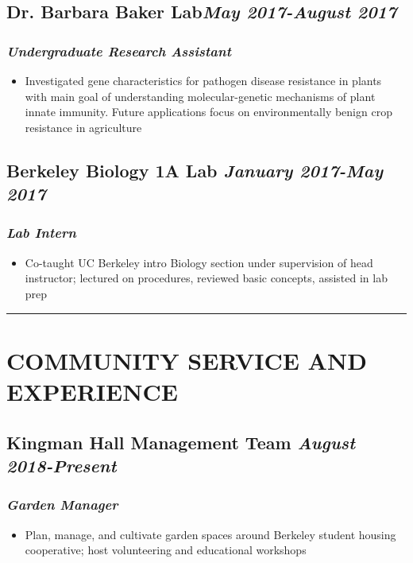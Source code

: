 \documentclass{article}
\begin{document}
\subsection*{\bf{Dr. Barbara Baker Lab}\hfill\textit{\small May 2017-August 2017}}
\subsubsection*{\textit{Undergraduate Research Assistant}}
\begin{itemize}
    \item {Investigated gene characteristics for pathogen disease resistance in plants with main goal of understanding molecular-genetic mechanisms of plant innate immunity. Future applications focus on environmentally benign crop resistance in agriculture}
\end{itemize}

\subsection*{\bf{Berkeley Biology 1A Lab} \hfill \textit{\small January 2017-May 2017}}
\subsubsection*{\textit{Lab Intern}}
\begin{itemize}
    \item {Co-taught UC Berkeley intro Biology section under supervision of head instructor; lectured on procedures, reviewed basic concepts, assisted in lab prep}
\end{itemize}

\noindent\rule{19cm}{0.4pt}

\section*{\textsc{\large COMMUNITY SERVICE AND EXPERIENCE}}
\subsection*{\bf{Kingman Hall Management Team} \hfill \textit{\small August 2018-Present}}
\subsubsection*{\textit{Garden Manager}}
\begin{itemize}
\item {Plan, manage, and cultivate garden spaces around Berkeley  student housing cooperative; host volunteering and educational workshops}
\end{itemize}
\end{document}
